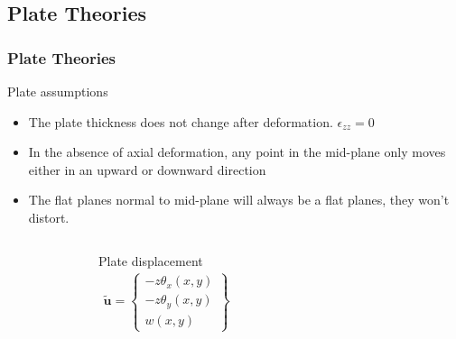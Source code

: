 \documentclass[9pt]{beamer}
\begin{document}
\subsection{Plate Theories}
\begin{frame}
\frametitle{Plate Theories}

\begin{block}{Plate assumptions}
\begin{itemize}
\item The plate thickness does not change after deformation.  $\epsilon_{zz} = 0$ 

\item  In the absence of axial deformation, any point in the mid-plane only moves either in an upward or downward direction

\item  The flat planes normal to mid-plane will always be a flat planes, they won't distort. 
\end{itemize}
\end{block}
\begin{columns}
\begin{figure}[ht!]
\centering
\label{fig:Domain}
\end{figure}
\begin{block}{Plate displacement}
\begin{equation*}
 \begin{split}
\tilde{\mathbf{u}} =
\left\{
\begin{array}{r}
 - z \theta_x \left(x,y\right) \\
 - z \theta_y \left(x,y\right)\\
  w \left(x, y \right) 
\end{array} \right\}
\end{split}
\end{equation*}
\end{block}

\end{columns}
\end{frame}
\end{document}
